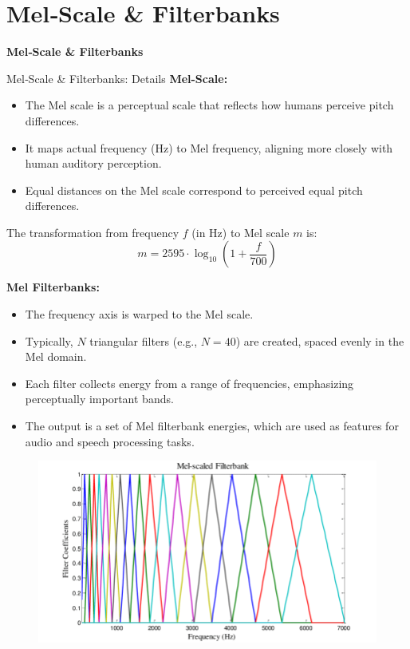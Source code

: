\section{Mel‑Scale \& Filterbanks}
\begin{frame}{}
    \LARGE \textbf{Mel‑Scale \& Filterbanks}
\end{frame}


\begin{frame}[allowframebreaks]{Mel‑Scale \& Filterbanks: Details}
    \textbf{Mel-Scale:}
    \begin{itemize}
        \item The Mel scale is a perceptual scale that reflects how humans perceive pitch differences.
        \item It maps actual frequency (Hz) to Mel frequency, aligning more closely with human auditory perception.
        \item Equal distances on the Mel scale correspond to perceived equal pitch differences.
    \end{itemize}

    \vspace{0.5em}
    The transformation from frequency $f$ (in Hz) to Mel scale $m$ is:
    \begin{equation}
        m = 2595 \cdot \log_{10}\left(1 + \frac{f}{700}\right)
    \end{equation}

\framebreak
    \textbf{Mel Filterbanks:} 
    \begin{itemize}
        \item The frequency axis is warped to the Mel scale.
        \item Typically, $N$ triangular filters (e.g., $N=40$) are created, spaced evenly in the Mel domain.
        \item Each filter collects energy from a range of frequencies, emphasizing perceptually important bands.
        \item The output is a set of Mel filterbank energies, which are used as features for audio and speech processing tasks.
    \end{itemize}

    \begin{figure}
        \centering
        \includegraphics[width=\textwidth,height=0.8\textheight,keepaspectratio]{images/audio-nlp/mel-scaled-filterbanks.png}
    \end{figure}


\end{frame}
